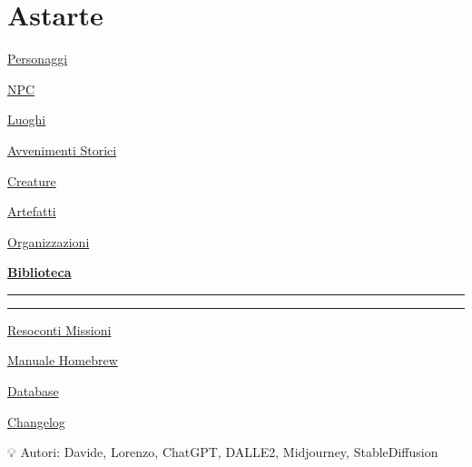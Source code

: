 \section{Astarte}\label{astarte}

\href{Personaggi\%20e2c02118156549239b85d1d90839fcd2.md}{Personaggi}

\href{NPC\%20b00e637b988943b6999cd6d7d81d5e79.md}{NPC}

\href{Luoghi\%20042855bb48ba48f49b68be717dfe4109.md}{Luoghi}

\href{Avvenimenti\%20Storici\%2075b2b1147069437096eb3abd97ec671d.md}{Avvenimenti
Storici}

\href{Creature\%20a47244a90b9b4706abd94b5ebe6c29b5.md}{Creature}

\href{Artefatti\%208b961ced864042f88e74971687e17c37.md}{Artefatti}

\href{Organizzazioni\%204c2aa604a1a24fbf998929a1714a670a.md}{Organizzazioni}

\href{Biblioteca\%20274153d42c8f4d78a7dc64e2e6fda353.md}{\textbf{Biblioteca}}

\begin{center}\rule{0.5\linewidth}{0.5pt}\end{center}

\begin{center}\rule{0.5\linewidth}{0.5pt}\end{center}

\href{Resoconti\%20Missioni\%2092943c8ee5db42a9b9a205e8cd7e6ebc.md}{Resoconti
Missioni}

\href{Manuale\%20Homebrew\%20b09a6f36c3044561850518fa25713f78.md}{Manuale
Homebrew}

\href{Database\%200186c0d2d6894697a8dc735941ece814.md}{Database}

\href{Changelog\%20070c41605f494b0aaaaae8bc2f356bca.md}{Changelog}

💡 Autori: Davide, Lorenzo, ChatGPT, DALLE2, Midjourney, StableDiffusion
